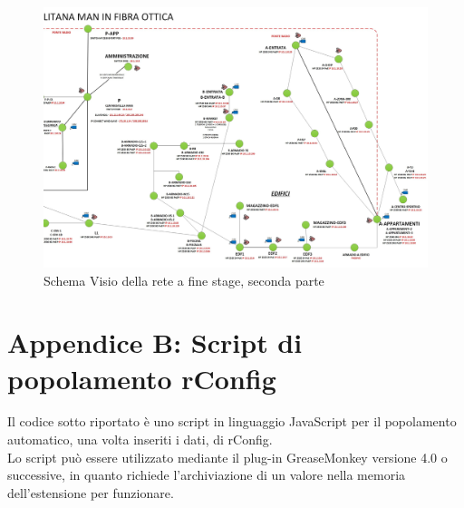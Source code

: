 \documentclass[Tesi.tex]{subfiles}
\begin{document}
\begin{landscape}
\begin{figure}[H]
	\centering
	\includegraphics[width=1\linewidth]{"images/schema_WAN_anonimo_dopo_B"}
	\caption{Schema Visio della rete a fine stage, seconda parte}
	\label{fig:Schema Visio della rete a fine stage, seconda parte}
\end{figure}
\end{landscape}

\label{sec:Appendice B}
\section*{Appendice B: Script di popolamento rConfig}
Il codice sotto riportato è uno script in linguaggio JavaScript per il popolamento automatico, una volta inseriti i dati, di rConfig. \\
Lo script può essere utilizzato mediante il plug-in GreaseMonkey versione 4.0 o successive, in quanto richiede l'archiviazione di un valore nella memoria dell'estensione per funzionare. \\
\end{document}
